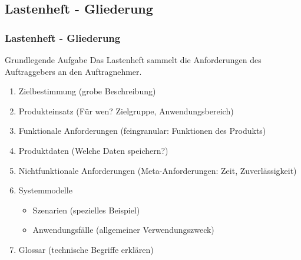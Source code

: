 \documentclass[18pt]{beamer}
\begin{document}
	\subsection{Lastenheft - Gliederung}
	\begin{frame}
		\frametitle{Lastenheft - Gliederung}
		\begin{block}{Grundlegende Aufgabe}
			Das Lastenheft sammelt die Anforderungen des Auftraggebers an den Auftragnehmer.
		\end{block}
		\begin{enumerate}
			\item \pause Zielbestimmung (grobe Beschreibung) \pause 
			\item Produkteinsatz (Für wen? Zielgruppe, Anwendungsbereich)\pause
			\item Funktionale Anforderungen (feingranular: Funktionen des Produkts)\pause 
			\item Produktdaten (Welche Daten speichern?)\pause
			\item Nichtfunktionale Anforderungen (Meta-Anforderungen: Zeit, Zuverlässigkeit)\pause 
			\item Systemmodelle
			\begin{itemize}
				\item Szenarien (spezielles Beispiel)
				\item Anwendungsfälle (allgemeiner Verwendungszweck)
			\end{itemize}
			\pause
			\item Glossar (technische Begriffe erklären)
		\end{enumerate}
	\end{frame}
	
\end{document}
